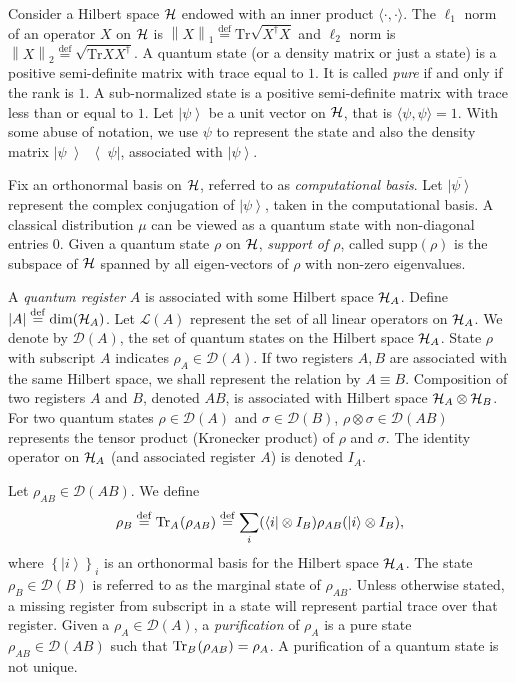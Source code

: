 \documentclass[11pt,a4paper]{article}
\def\H{\CMcal{H}}
\theoremstyle{plain}
\theoremstyle{definition}
\newcommand {\br} [1] {\ensuremath{ \left( #1 \right) }}
\newcommand {\minusspace} {\: \! \!}
\newcommand {\fn} [2] {\ensuremath{ #1 \minusspace \br{ #2 } }}
\newcommand {\defeq} {\ensuremath{ \stackrel{\mathrm{def}}{=} }}
\newcommand {\norm} [1] {\ensuremath{ \left\| #1 \right\| }}
\newcommand {\normsub} [2] {\ensuremath{ \norm{#1}_{#2} }}
\newcommand {\onenorm} [1] {\normsub{#1}{1}}
\newcommand {\bra} [1] {\ensuremath{ \left\langle #1 \right| }}
\newcommand {\ket} [1] {\ensuremath{ \left| #1 \right\rangle }}
\newcommand {\ketbratwo} [2] {\ensuremath{ \left| #1 \middle\rangle \middle\langle #2 \right| }}
\newcommand {\ketbra} [1] {\ketbratwo{#1}{#1}}
\newcommand {\cspace} [1] {\ensuremath{\mathnormal{#1}}}
\newcommand {\Tr} {\ensuremath{ \mathrm{Tr} }}
\newcommand {\partrace} [2] {\fn{\Tr_{#1}}{#2}}
\newcommand {\set} [1] {\ensuremath{ \left\lbrace #1 \right\rbrace }}
\newcommand {\reg} [1] {\ensuremath{ \mathnormal{#1} }}
\newcommand{\conjugate}[1]{\overline{#1}}
\begin{document}
Consider a Hilbert space $\H$ endowed with an inner product $\langle \cdot, \cdot \rangle$. The $\ell_1$ norm of an operator $X$ on $\H$ is $\onenorm{X}\defeq\Tr\sqrt{X^{\dag}X}$ and $\ell_2$ norm is $\norm{X}_2\defeq\sqrt{\Tr XX^{\dag}}$. A quantum state (or a density matrix or just a state) is a positive semi-definite matrix with trace equal to $1$. It is called {\em pure} if and only if the rank is $1$. A sub-normalized state is a positive semi-definite matrix with trace less than or equal to $1$. Let $\ket{\psi}$ be a unit vector on $\H$, that is $\langle \psi,\psi \rangle=1$.  With some abuse of notation, we use $\psi$ to represent the state and also the density matrix $\ketbra{\psi}$, associated with $\ket{\psi}$. 

Fix an orthonormal basis on $\H$, referred to as {\em computational basis}. Let $\conjugate{\ket{\psi}}$ represent the complex conjugation of $\ket{\psi}$, taken in the computational basis. A classical distribution $\mu$ can be viewed as a quantum state with non-diagonal entries $0$.  Given a quantum state $\rho$ on $\H$, {\em support of $\rho$}, called $\text{supp}(\rho)$ is the subspace of $\H$ spanned by all eigen-vectors of $\rho$ with non-zero eigenvalues.
 
A {\em quantum register} $A$ is associated with some Hilbert space $\H_A$. Define $|A| \defeq \dim(\H_A)$. Let $\mathcal{L}(A)$ represent the set of all linear operators on $\H_A$. We denote by $\mathcal{D}(A)$, the set of quantum states on the Hilbert space $\H_A$. State $\rho$ with subscript $A$ indicates $\rho_A \in \mathcal{D}(A)$. If two registers $A,B$ are associated with the same Hilbert space, we shall represent the relation by $A\equiv B$.  Composition of two registers $A$ and $B$, denoted $AB$, is associated with Hilbert space $\H_A \otimes \H_B$.  For two quantum states $\rho\in \mathcal{D}(A)$ and $\sigma\in \mathcal{D}(B)$, $\rho\otimes\sigma \in \mathcal{D}(AB)$ represents the tensor product (Kronecker product) of $\rho$ and $\sigma$. The identity operator on $\H_A$ (and associated register $A$) is denoted $I_A$. 

Let $\rho_{AB} \in \mathcal{D}(AB)$. We define
\[ \rho_{\reg{B}} \defeq \partrace{\reg{A}}{\rho_{AB}}
\defeq \sum_i (\bra{i} \otimes I_{\cspace{B}})
\rho_{AB} (\ket{i} \otimes I_{\cspace{B}}) , \]
where $\set{\ket{i}}_i$ is an orthonormal basis for the Hilbert space $\H_A$.
The state $\rho_B\in \mathcal{D}(B)$ is referred to as the marginal state of $\rho_{AB}$. Unless otherwise stated, a missing register from subscript in a state will represent partial trace over that register. Given a $\rho_A\in\mathcal{D}(A)$, a {\em purification} of $\rho_A$ is a pure state $\rho_{AB}\in \mathcal{D}(AB)$ such that $\partrace{\reg{B}}{\rho_{AB}}=\rho_A$. A purification of a quantum state is not unique.
\end{document}
